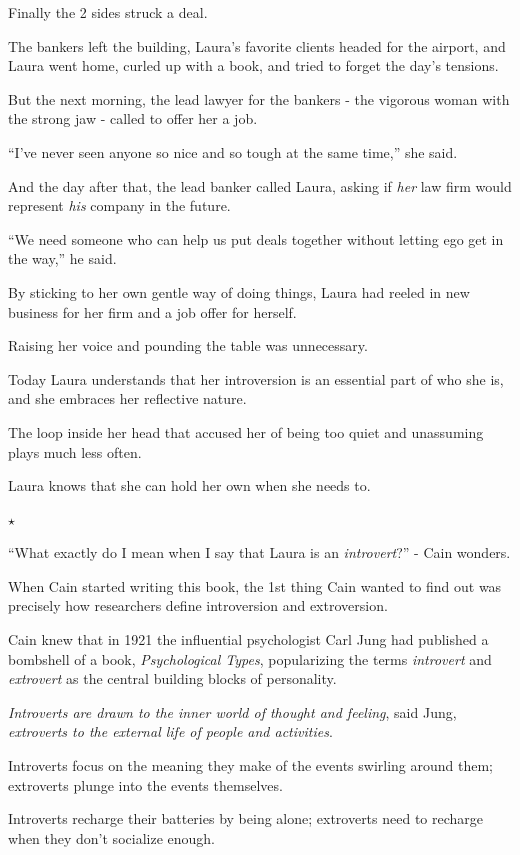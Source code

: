 \documentclass[oneside]{article}
\numberwithin{equation}{section}
\begin{document}
%
Finally the 2 sides struck a deal.

The bankers left the building, Laura's favorite clients headed for the airport, and Laura went home, curled up with a book, and tried to forget the day's tensions.

%
But the next morning, the lead lawyer for the bankers - the vigorous woman with the strong jaw - called to offer her a job.

``I've never seen anyone so nice and so tough at the same time,'' she said.

And the day after that, the lead banker called Laura, asking if \textit{her} law firm would represent \textit{his} company in the future.

``We need someone who can help us put deals together without letting ego get in the way,'' he said.

%
By sticking to her own gentle way of doing things, Laura had reeled in new business for her firm and a job offer for herself.

Raising her voice and pounding the table was unnecessary.

%
Today Laura understands that her introversion is an essential part of who she is, and she embraces her reflective nature.

The loop inside her head that accused her of being too quiet and unassuming plays much less often.

Laura knows that she can hold her own when she needs to.
\begin{center}
    $\star$
\end{center}
``What exactly do I mean when I say that Laura is an \textit{introvert}?'' - Cain wonders.

When Cain started writing this book, the 1st thing Cain wanted to find out was precisely how researchers define introversion and extroversion.

Cain knew that in 1921 the influential psychologist Carl Jung had published a bombshell of a book, \textit{Psychological Types}, popularizing the terms \textit{introvert} and \textit{extrovert} as the central building blocks of personality.

\textit{Introverts are drawn to the inner world of thought and feeling}, said Jung, \textit{extroverts to the external life of people and activities}.

Introverts focus on the meaning they make of the events swirling around them; extroverts plunge into the events themselves.

Introverts recharge their batteries by being alone; extroverts need to recharge when they don't socialize enough.
\end{document}
